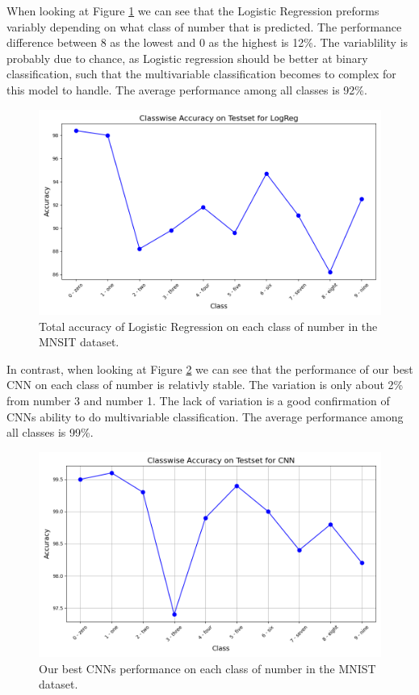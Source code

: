 When looking at Figure \ref{fig:ClasswiseAccuracyLogReg} we can see that the Logistic Regression preforms variably depending on what class of number that is predicted. The performance difference between 8 as the lowest and 0 as the highest is 12\%. The variablility is probably due to chance, as Logistic regression should be better at binary classification, such that the multivariable classification becomes to complex for this model to handle. The average performance among all classes is 92\%.

\begin{figure}[H]
    \centering
    \includegraphics[width=\textwidth]{results/evaluation/LogReg_classwise_acc.png}
    \caption{Total accuracy of Logistic Regression on each class of number in the MNSIT dataset.}
    \label{fig:ClasswiseAccuracyLogReg}
\end{figure}

In contrast, when looking at Figure \ref{fig:ClasswiseAccuracyCNN} we can see that the performance of our best CNN on each class of number is relativly stable. The variation is only about 2\% from number 3 and number 1. The lack of variation is a good confirmation of CNNs ability to do multivariable classification. The average performance among all classes is 99\%.

\begin{figure}[H]
    \centering
    \includegraphics[width=\linewidth]{results/evaluation/CNN_classwise_acc.png}
    \caption{Our best CNNs performance on each class of number in the MNIST dataset.}
    \label{fig:ClasswiseAccuracyCNN}
\end{figure}


